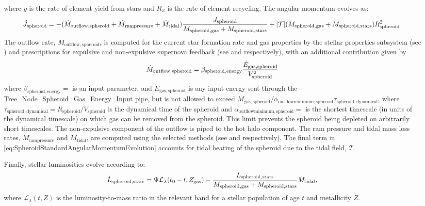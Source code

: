 where $\dot{y}$ is the rate of element yield from stars and $\dot{R}_Z$ is the rate of element recycling. The angular momentum evolves as:
\begin{equation}
 \dot{J}_\mathrm{spheroid} = - (\dot{M}_\mathrm{outflow, spheroid} + \dot{M}_\mathrm{ram pressure}+\dot{M}_\mathrm{tidal}) {J_\mathrm{spheroid} \over M_\mathrm{spheroid, gas} + M_\mathrm{spheroid, stars}} + |\mathcal{T}| ( M_\mathrm{spheroid, gas} + M_\mathrm{spheroid, stars} ) R_\mathrm{spheroid}^2.
 \label{eq:SpheroidStandardAngularMomentumEvolution}
\end{equation}
The outflow rate, $\dot{M}_\mathrm{outflow, spheroid}$, is computed for the current star formation rate and gas properties by the stellar properties subsystem (see ) and prescriptions for expulsive and non-expulsive supernova feedback (see  and  respectively), with an additional contribution given by
\begin{equation}
 \dot{M}_\mathrm{outflow, spheroid} = \beta_\mathrm{spheroid, energy} {\dot{E}_\mathrm{gas, spheroid} \over V_\mathrm{spheroid}^2}
\end{equation}
where $\beta_\mathrm{spheroid, energy}=${\normalfont \ttfamily [spheroidEnergeticOutflowMassRate]} is an input parameter, and $\dot{E}_\mathrm{gas,spheroid}$ is any input energy sent through the {\normalfont \ttfamily Tree\_Node\_Spheroid\_Gas\_Energy\_Input} pipe, but is not allowed to exceed $M_\mathrm{gas, spheroid}/ \alpha_\mathrm{outflow minimum, spheroid} \tau_\mathrm{spheroid, dynamical}$, where $\tau_\mathrm{spheroid, dynamical}=R_\mathrm{spheroid}/V_\mathrm{spheroid}$ is the dynamical time of the spheroid and $\alpha_\mathrm{outflow minimum, spheroid}=${\normalfont \ttfamily [spheroidOutflowTimescaleMinimum]} is the shortest timescale (in units of the dynamical timescale) on which gas can be removed from the spheroid. This limit prevents the spheroid being depleted on arbitrarily short timescales. The non-expulsive \gls{component} of the outflow is piped to the hot halo component. The ram pressure and tidal mass loss rates, $\dot{M}_\mathrm{ram pressure}$ and $\dot{M}_\mathrm{tidal}$, are computed using the selected methods (see  and  respectively). The final term in \ref{eq:SpheroidStandardAngularMomentumEvolution} accounts for tidal heating of the spheroid due to the tidal field, $\mathcal{T}$.

Finally, stellar luminosities evolve according to:
\begin{equation}
\dot{L}_\mathrm{spheroid, stars} = \Psi \mathcal{L}_\lambda(t_0-t,Z_\mathrm{gas}) - {L_\mathrm{spheroid, stars} \over M_\mathrm{spheroid, gas} + M_\mathrm{spheroid, stars}} \dot{M}_\mathrm{tidal},
\end{equation}
where $\mathcal{L}_\lambda(t,Z)$ is the luminosity-to-mass ratio in the relevant band for a stellar population of age $t$ and metallicity $Z$.

